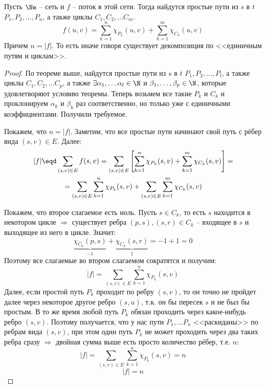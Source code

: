 \Cons Пусть $\Ne$ -- сеть и $f$ -- поток в этой сети. Тогда найдутся простые пути из $s$ в $t$ $P_1, P_2, \dots, P_n$, а также циклы $C_1, C_2, \dots C_m$.
\begin{equation*}
    f(u, v) = \sum\limits_{k = 1}^n \chi_{P_k}(u, v) + \sum\limits_{k = 1}^m \chi_{C_k}(u, v)
\end{equation*}
Причем $n = |f|$. То есть иначе говоря существует декомпозиция по <<единичным путям и циклам>>.
\begin{proof}

    По теореме выше, найдутся простые пути из $s$ в $t$ $P_1, P_2, \dots, P_l$, а также циклы $C_1, C_2, \dots C_p$, а также $\exists \alpha_1, \dots \alpha_l \in \N$ и $\beta_1, \dots, \beta_p \in \N$, которые удовлетворяют условию теоремы.
    Теперь возьмем все такие $P_k$ и $C_k$ и проклонируем $\alpha_k$ и $\beta_k$ раз соответственно, но только уже с единичными коэффициентами. Получили требуемое.

    Покажем, что $n = |f|$. Заметим, что все простые пути начинают свой путь с рёбер вида $(s, v) \in E$. Далее:
    \begin{multline*}
        |f| \eqd \sum\limits_{(s, v) \in E} f(s, v) = \sum\limits_{(s, v) \in E} \left[ \sum\limits_{k = 1}^n \chi_{P_k}(s, v) + \sum\limits_{k = 1}^m \chi_{C_k}(s, v) \right] = \\
        = \sum\limits_{(s, v) \in E} \sum\limits_{k = 1}^n \chi_{P_k}(s, v) + \sum\limits_{(s, v) \in E}\sum\limits_{k = 1}^m \chi_{C_k}(s, v)
    \end{multline*}

    Покажем, что второе слагаемое есть ноль. Пусть $s \in C_k$, то есть $s$ находится в некотором цикле $\Rightarrow$ существует ребра $(p, s), (s, r) \in C_k$ -- входящее в $s$ и выходящее из него в цикле. Значит:
    \begin{equation*}
        \underbrace{\chi_{C_k} (p, s)}_{-1} + \underbrace{\chi_{C_k} (s, r)}_{1} = -1 + 1 = 0
    \end{equation*}
    Поэтому все слагаемые во втором слагаемом сократятся и получим:
    \begin{equation*}
        |f| = \sum\limits_{(s, v) \in E} \sum\limits_{k = 1}^n \chi_{P_k}(s, v)
    \end{equation*}
    Далее, если простой путь $P_k$ проходит по ребру $(s, v)$, то он точно не пройдет далее через некоторое другое ребро $(s, u)$, т.к. он бы пересек $s$ и не был бы простым. В то же время любой путь $P_k$ обязан проходить через какое-нибудь ребро $(s, v)$.
    Поэтому получается, что у нас пути $P_1, \dots P_n$ <<раскиданы>> по ребрам вида $(s, v)$, при этом один путь $P_k$ не может проходить через два таких ребра сразу $\Rightarrow$ двойная сумма выше есть просто количество рёбер, т.е. $n$:
    \begin{equation*}
        |f| = \sum\limits_{(s, v) \in E} \sum\limits_{k = 1}^n \chi_{P_k}(s, v) = n
    \end{equation*}
    \begin{equation*}
        |f| = n
    \end{equation*}
\end{proof}

